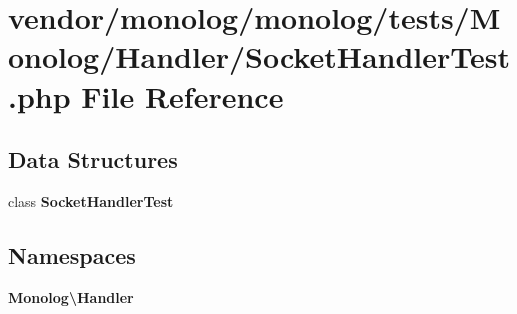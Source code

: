 \section{vendor/monolog/monolog/tests/\+Monolog/\+Handler/\+Socket\+Handler\+Test.php File Reference}
\label{_socket_handler_test_8php}
\subsection*{Data Structures}
\begin{DoxyCompactItemize}
\item 
class {\bf Socket\+Handler\+Test}
\end{DoxyCompactItemize}
\subsection*{Namespaces}
\begin{DoxyCompactItemize}
\item 
 {\bf Monolog\textbackslash{}\+Handler}
\end{DoxyCompactItemize}
